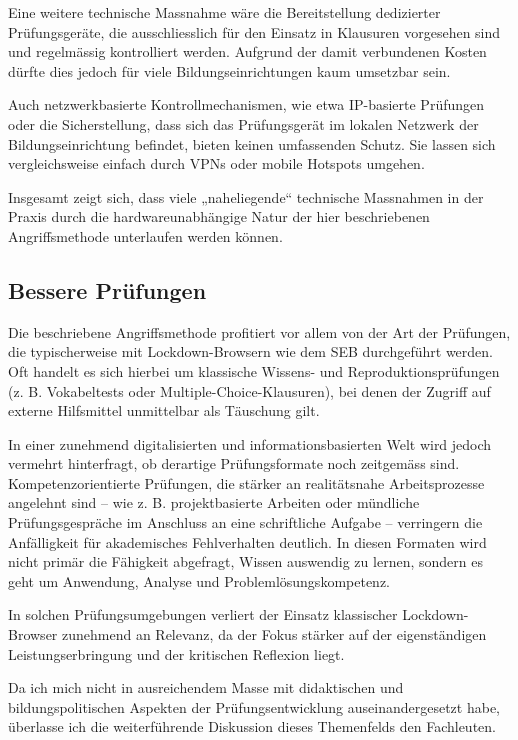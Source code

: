 \documentclass[14pt]{article}
\begin{document}
Eine weitere technische Massnahme wäre die Bereitstellung dedizierter Prüfungsgeräte, die ausschliesslich für den Einsatz in Klausuren vorgesehen sind und regelmässig kontrolliert werden. Aufgrund der damit verbundenen Kosten dürfte dies jedoch für viele Bildungseinrichtungen kaum umsetzbar sein.

Auch netzwerkbasierte Kontrollmechanismen, wie etwa IP-basierte Prüfungen oder die Sicherstellung, dass sich das Prüfungsgerät im lokalen Netzwerk der Bildungseinrichtung befindet, bieten keinen umfassenden Schutz. Sie lassen sich vergleichsweise einfach durch VPNs oder mobile Hotspots umgehen.

Insgesamt zeigt sich, dass viele „naheliegende“ technische Massnahmen in der Praxis durch die hardwareunabhängige Natur der hier beschriebenen Angriffsmethode unterlaufen werden können.

\subsection{Bessere Prüfungen}

Die beschriebene Angriffsmethode profitiert vor allem von der Art der Prüfungen, die typischerweise mit Lockdown-Browsern wie dem SEB durchgeführt werden. Oft handelt es sich hierbei um klassische Wissens- und Reproduktionsprüfungen (z. B. Vokabeltests oder Multiple-Choice-Klausuren), bei denen der Zugriff auf externe Hilfsmittel unmittelbar als Täuschung gilt.

In einer zunehmend digitalisierten und informationsbasierten Welt wird jedoch vermehrt hinterfragt, ob derartige Prüfungsformate noch zeitgemäss sind. Kompetenzorientierte Prüfungen, die stärker an realitätsnahe Arbeitsprozesse angelehnt sind – wie z. B. projektbasierte Arbeiten oder mündliche Prüfungsgespräche im Anschluss an eine schriftliche Aufgabe – verringern die Anfälligkeit für akademisches Fehlverhalten deutlich. In diesen Formaten wird nicht primär die Fähigkeit abgefragt, Wissen auswendig zu lernen, sondern es geht um Anwendung, Analyse und Problemlösungskompetenz.

In solchen Prüfungsumgebungen verliert der Einsatz klassischer Lockdown-Browser zunehmend an Relevanz, da der Fokus stärker auf der eigenständigen Leistungserbringung und der kritischen Reflexion liegt.

Da ich mich nicht in ausreichendem Masse mit didaktischen und bildungspolitischen Aspekten der Prüfungsentwicklung auseinandergesetzt habe, überlasse ich die weiterführende Diskussion dieses Themenfelds den Fachleuten.
\end{document}
